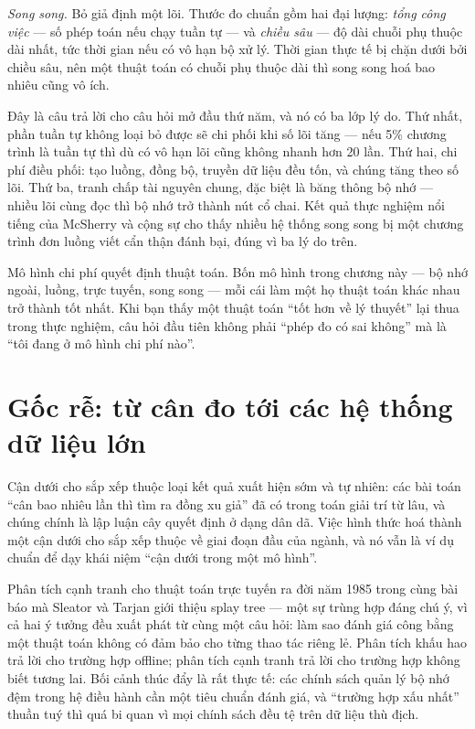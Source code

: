 \documentclass[../../algorithm.tex]{subfiles}
\begin{document}
\emph{Song song.} Bỏ giả định một lõi. Thước đo chuẩn gồm hai đại lượng: \emph{tổng công việc} --- số phép toán nếu chạy tuần tự --- và \emph{chiều sâu} --- độ dài chuỗi phụ thuộc dài nhất, tức thời gian nếu có vô hạn bộ xử lý. Thời gian thực tế bị chặn dưới bởi chiều sâu, nên một thuật toán có chuỗi phụ thuộc dài thì song song hoá bao nhiêu cũng vô ích.

Đây là câu trả lời cho câu hỏi mở đầu thứ năm, và nó có ba lớp lý do. Thứ nhất, phần tuần tự không loại bỏ được sẽ chi phối khi số lõi tăng --- nếu 5\% chương trình là tuần tự thì dù có vô hạn lõi cũng không nhanh hơn 20 lần. Thứ hai, chi phí điều phối: tạo luồng, đồng bộ, truyền dữ liệu đều tốn, và chúng tăng theo số lõi. Thứ ba, tranh chấp tài nguyên chung, đặc biệt là băng thông bộ nhớ --- nhiều lõi cùng đọc thì bộ nhớ trở thành nút cổ chai. Kết quả thực nghiệm nổi tiếng của McSherry và cộng sự\cite{mcsherry2015} cho thấy nhiều hệ thống song song bị một chương trình đơn luồng viết cẩn thận đánh bại, đúng vì ba lý do trên.

\begin{cannho}
Mô hình chi phí quyết định thuật toán. Bốn mô hình trong chương này --- bộ nhớ ngoài, luồng, trực tuyến, song song --- mỗi cái làm một họ thuật toán khác nhau trở thành tốt nhất. Khi bạn thấy một thuật toán ``tốt hơn về lý thuyết'' lại thua trong thực nghiệm, câu hỏi đầu tiên không phải ``phép đo có sai không'' mà là ``tôi đang ở mô hình chi phí nào''.
\end{cannho}

\section{Gốc rễ: từ cân đo tới các hệ thống dữ liệu lớn}

Cận dưới cho sắp xếp thuộc loại kết quả xuất hiện sớm và tự nhiên: các bài toán ``cân bao nhiêu lần thì tìm ra đồng xu giả'' đã có trong toán giải trí từ lâu, và chúng chính là lập luận cây quyết định ở dạng dân dã. Việc hình thức hoá thành một cận dưới cho sắp xếp thuộc về giai đoạn đầu của ngành, và nó vẫn là ví dụ chuẩn để dạy khái niệm ``cận dưới trong một mô hình''.

Phân tích cạnh tranh cho thuật toán trực tuyến ra đời năm 1985 trong cùng bài báo mà Sleator và Tarjan giới thiệu splay tree\cite{sleator1985} --- một sự trùng hợp đáng chú ý, vì cả hai ý tưởng đều xuất phát từ cùng một câu hỏi: làm sao đánh giá công bằng một thuật toán không có đảm bảo cho từng thao tác riêng lẻ. Phân tích khấu hao trả lời cho trường hợp offline; phân tích cạnh tranh trả lời cho trường hợp không biết tương lai. Bối cảnh thúc đẩy là rất thực tế: các chính sách quản lý bộ nhớ đệm trong hệ điều hành cần một tiêu chuẩn đánh giá, và ``trường hợp xấu nhất'' thuần tuý thì quá bi quan vì mọi chính sách đều tệ trên dữ liệu thù địch.
\end{document}
